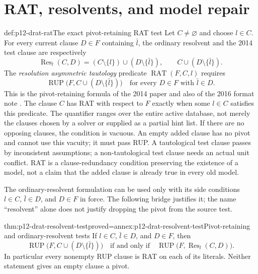 \section{RAT, resolvents, and model repair}

\begin{hbdefinition}{def:p12-drat-rat}{The exact pivot-retaining RAT test}
Let \(C\ne\varnothing\) and choose \(l\in C\).  For every current
clause \(D\in F\) containing \(\bar l\), the ordinary resolvent and the
2014 test clause are respectively
\[
 \operatorname{Res}_{l}(C,D)
   =(C\setminus\{l\})\cup(D\setminus\{\bar l\}),
 \qquad
 C\cup(D\setminus\{\bar l\}).
\]
The \emph{resolution asymmetric tautology} predicate
\(\operatorname{RAT}(F,C,l)\) requires
\[
 \operatorname{RUP}\bigl(F,C\cup(D\setminus\{\bar l\})\bigr)
 \quad\text{for every }D\in F\text{ with }\bar l\in D.
\]
This is the pivot-retaining formula of the 2014 paper and also of the 2016
format note \cite[Sec.~2]{WetzlerHeuleHunt2014AuthorDRAT}
\cite[Clause Addition Preconditions]{Heule2016DRATFormatV1}.
The clause \(C\) has RAT with respect to \(F\) exactly when some
\(l\in C\) satisfies this predicate.  The quantifier ranges over the entire
active database, not merely the clauses
chosen by a solver or supplied as a partial hint list.  If there are no
opposing clauses, the condition is vacuous.  An empty added clause has no pivot
and cannot use this vacuity; it must pass RUP.  A tautological test clause
passes by inconsistent assumptions; a non-tautological test clause needs an
actual unit conflict.  RAT is a clause-redundancy condition preserving the
existence of a model, not a claim that the added clause is already true in
every old model.

The ordinary-resolvent formulation can be used only with its side conditions
\(l\in C\), \(\bar l\in D\), and \(D\in F\) in force.  The following
bridge justifies it; the name ``resolvent'' alone does not justify dropping the
pivot from the source test.
\end{hbdefinition}

\begin{hblemma}{thm:p12-drat-resolvent-test}{proved=annex:p12-drat-resolvent-test}{Pivot-retaining and ordinary-resolvent tests}
If \(l\in C\), \(\bar l\in D\), and \(D\in F\), then
\[
 \operatorname{RUP}\bigl(F,C\cup(D\setminus\{\bar l\})\bigr)
 \quad\text{if and only if}\quad
 \operatorname{RUP}\bigl(F,\operatorname{Res}_{l}(C,D)\bigr).
\]
In particular every nonempty RUP clause is RAT on each of its literals.
Neither statement gives an empty clause a pivot.
\end{hblemma}

